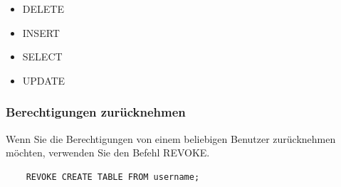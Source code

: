 \begin{itemize}
    \item DELETE
    \item INSERT
    \item SELECT
    \item UPDATE
\end{itemize}

\subsubsection{Berechtigungen zurücknehmen}
Wenn Sie die Berechtigungen von einem beliebigen Benutzer zurücknehmen möchten, verwenden Sie den Befehl REVOKE.

\begin{lstlisting}
    REVOKE CREATE TABLE FROM username;
\end{lstlisting}